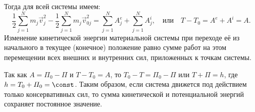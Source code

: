 Тогда для всей системы имеем:
\[
    \frac{1}{2}\sum_{j=1}^N m_j\vec{v}_j^2 -
    \frac{1}{2}\sum_{j=1}^N m_j\vec{v}_{0j}^2 =
    \sum_{j=1}^N A^e_j + \sum_{j=1}^N A^i_j, \quad \text{или} \quad
    T - T_0 = A^e + A^i = A.
\]
Изменение кинетической энергии материальной системы при переходе её из
начального в текущее (конечное) положение равно сумме работ на этом перемещении
всех внешних и внутренних сил, приложенных к точкам системы.

Так как \( A = \varPi_0 - \varPi \) и \( T - T_0 = A \), то \( T_0 - T =
\varPi_0 - \varPi \) или \( T + \varPi = h \), где \( h = T_0 + \varPi_0 =
\const \).
Таким образом, если система движется под действием только консервативных сил, то
сумма кинетической и потенциальной энергий сохраняет постоянное значение.

\newpage
